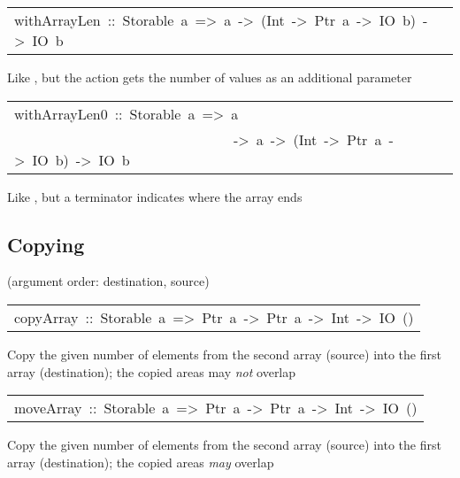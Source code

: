 \begin{haddockdesc}
\item[\begin{tabular}{@{}l}
withArrayLen\ ::\ Storable\ a\ =>\ {\char 91}a{\char 93}\ ->\ (Int\ ->\ Ptr\ a\ ->\ IO\ b)\ ->\ IO\ b
\end{tabular}]\haddockbegindoc
Like , but the action gets the number of values
 as an additional parameter
\par

\end{haddockdesc}
\begin{haddockdesc}
\item[\begin{tabular}{@{}l}
withArrayLen0\ ::\ Storable\ a\ =>\ a\\\ \ \ \ \ \ \ \ \ \ \ \ \ \ \ \ \ \ \ \ \ \ \ \ \ \ \ \ \ \ \ ->\ {\char 91}a{\char 93}\ ->\ (Int\ ->\ Ptr\ a\ ->\ IO\ b)\ ->\ IO\ b
\end{tabular}]\haddockbegindoc
Like , but a terminator indicates where the array ends
\par

\end{haddockdesc}
\subsection{Copying
}
(argument order: destination, source)
\par

\begin{haddockdesc}
\item[\begin{tabular}{@{}l}
copyArray\ ::\ Storable\ a\ =>\ Ptr\ a\ ->\ Ptr\ a\ ->\ Int\ ->\ IO\ ()
\end{tabular}]\haddockbegindoc
Copy the given number of elements from the second array (source) into the
 first array (destination); the copied areas may \emph{not} overlap
\par

\end{haddockdesc}
\begin{haddockdesc}
\item[\begin{tabular}{@{}l}
moveArray\ ::\ Storable\ a\ =>\ Ptr\ a\ ->\ Ptr\ a\ ->\ Int\ ->\ IO\ ()
\end{tabular}]\haddockbegindoc
Copy the given number of elements from the second array (source) into the
 first array (destination); the copied areas \emph{may} overlap
\par

\end{haddockdesc}

